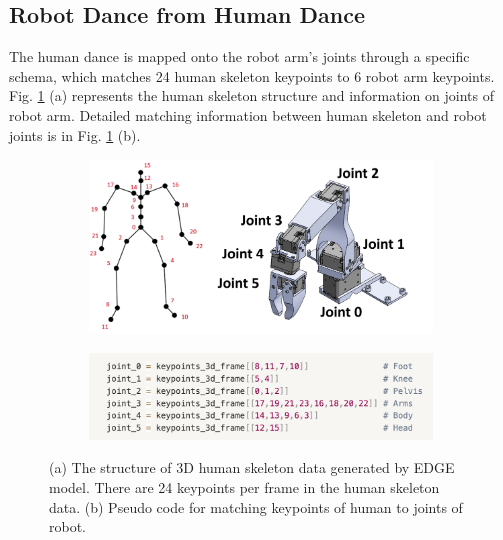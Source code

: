 \documentclass[letterpaper, 10 pt, conference]{ieeeconf}  %
\begin{document}
\subsection{Robot Dance from Human Dance}
The human dance is mapped onto the robot arm's joints through a specific schema, which matches 24 human skeleton keypoints to 6 robot arm keypoints. Fig. \ref{fig:human_robot_keypoints} (a) represents the human skeleton structure and information on joints of robot arm. Detailed matching information between human skeleton and robot joints is in Fig. \ref{fig:human_robot_keypoints} (b).

\begin{figure}[h]
    \centering
    \begin{subfigure}[b]{\linewidth}
        \centering
        \includegraphics[width=0.7\linewidth]{figures/figure_method_human_robot_matching_1.jpg}
        \caption{}
    \end{subfigure}
    \vfill
    \begin{subfigure}[b]{\linewidth}
        \centering
        \includegraphics[width=0.9\linewidth]{figures/figure_method_human_robot_matching_2.jpg}
        \caption{}
    \end{subfigure}
    \caption{(a) The structure of 3D human skeleton data generated by EDGE model. There are 24 keypoints per frame in the human skeleton data. (b) Pseudo code for matching keypoints of human to joints of robot.}\label{fig:human_robot_keypoints}
\end{figure}
\end{document}
